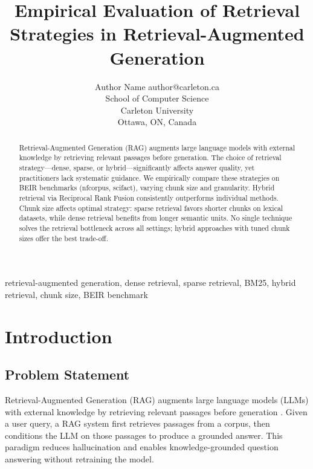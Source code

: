 \documentclass[twoside,11pt]{article}
\begin{document}
\title{Empirical Evaluation of Retrieval Strategies in Retrieval-Augmented Generation}

\author{\name Author Name \email author@carleton.ca \\
\addr School of Computer Science\\
Carleton University\\
Ottawa, ON, Canada}

\maketitle

\begin{abstract}
Retrieval-Augmented Generation (RAG) augments large language models with external knowledge by retrieving relevant passages before generation. The choice of retrieval strategy---dense, sparse, or hybrid---significantly affects answer quality, yet practitioners lack systematic guidance. We empirically compare these strategies on BEIR benchmarks (nfcorpus, scifact), varying chunk size and granularity. Hybrid retrieval via Reciprocal Rank Fusion consistently outperforms individual methods. Chunk size affects optimal strategy: sparse retrieval favors shorter chunks on lexical datasets, while dense retrieval benefits from longer semantic units. No single technique solves the retrieval bottleneck across all settings; hybrid approaches with tuned chunk sizes offer the best trade-off.
\end{abstract}

\begin{keywords}
retrieval-augmented generation, dense retrieval, sparse retrieval, BM25, hybrid retrieval, chunk size, BEIR benchmark
\end{keywords}

\section{Introduction}

\subsection{Problem Statement}

Retrieval-Augmented Generation (RAG) augments large language models (LLMs) with external knowledge by retrieving relevant passages before generation \citep{lewis2020rag}. Given a user query, a RAG system first retrieves passages from a corpus, then conditions the LLM on those passages to produce a grounded answer. This paradigm reduces hallucination and enables knowledge-grounded question answering without retraining the model.
\end{document}
